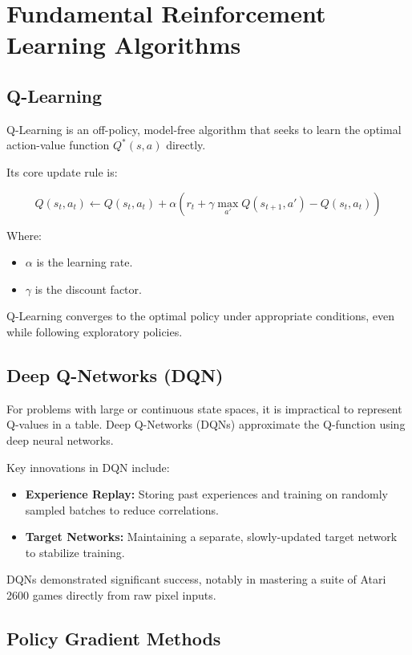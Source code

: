 \documentclass[openany]{book}
\begin{document}
\section{Fundamental Reinforcement Learning Algorithms}

\subsection{Q-Learning}

Q-Learning is an off-policy, model-free algorithm that seeks to learn the 
optimal action-value function \( Q^*(s,a) \) directly.

Its core update rule is:

\[
Q(s_t, a_t) \leftarrow Q(s_t, a_t) + \alpha \left( r_t + \gamma \max_{a'} 
Q(s_{t+1}, a') - Q(s_t, a_t) \right)
\]

Where:

\begin{itemize}
    \item \( \alpha \) is the learning rate.
    \item \( \gamma \) is the discount factor.
\end{itemize}

Q-Learning converges to the optimal policy under appropriate conditions, even 
while following exploratory policies.

\subsection{Deep Q-Networks (DQN)}

For problems with large or continuous state spaces, it is impractical to 
represent Q-values in a table. Deep Q-Networks (DQNs) approximate the Q-function 
using deep neural networks.

Key innovations in DQN include:

\begin{itemize}
    \item \textbf{Experience Replay:} Storing past experiences and training on 
    randomly sampled batches to reduce correlations.
    \item \textbf{Target Networks:} Maintaining a separate, slowly-updated 
    target network to stabilize training.
\end{itemize}

DQNs demonstrated significant success, notably in mastering a suite of Atari 
2600 games directly from raw pixel inputs.

\subsection{Policy Gradient Methods}
\end{document}

